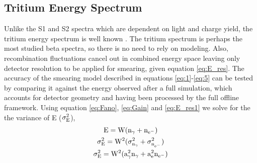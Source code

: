 





\subsection{Tritium Energy Spectrum}

Unlike the S1 and S2 spectra which are dependent on light and charge yield, the tritium energy spectrum is well known \cite{Tritium_Eq}. The tritium spectrum is perhaps the most studied beta spectra, so there is no need to rely on modeling.  Also, recombination fluctuations cancel out in combined energy space leaving only detector resolution to be applied for smearing, given equation \ref{eq:E_res}. The accuracy of the smearing model described in equations \ref{eq:1}-\ref{eq:5} can be tested by comparing it against the energy observed after a full simulation, which accounts for detector geometry and having been processed by the full offline framework. Using equation \ref{eq:Fano}, \ref{eq:Gain} and \ref{eq:E_res1} we solve for the the variance of E ($\rm \sigma_{E}^2$),
\begin{gather}
\label{eq:E_res1} \rm E= W(n_\gamma + n_{e^-}) \\
 \rm \sigma_{E}^2= W^2(\sigma_{n_\gamma}^2 + \sigma_{n_{e^-}}^2) \\ 
 \rm \sigma_{E}^2= W^2(a_\gamma^2 n_\gamma + a_e^2 n_{e^-})
\label{eq:E_res}
\end{gather}

